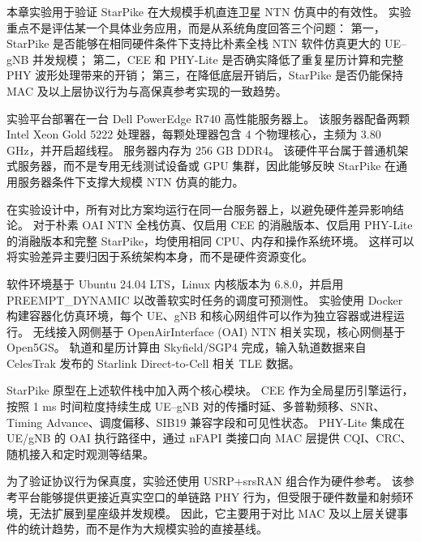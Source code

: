 

\label{prototype}

本章实验用于验证 StarPike 在大规模手机直连卫星 NTN 仿真中的有效性。
实验重点不是评估某一个具体业务应用，而是从系统角度回答三个问题：
第一，StarPike 是否能够在相同硬件条件下支持比朴素全栈 NTN 软件仿真更大的 UE--gNB 并发规模；
第二，CEE 和 PHY-Lite 是否确实降低了重复星历计算和完整 PHY 波形处理带来的开销；
第三，在降低底层开销后，StarPike 是否仍能保持 MAC 及以上层协议行为与高保真参考实现的一致趋势。


实验平台部署在一台 Dell PowerEdge R740 高性能服务器上。
该服务器配备两颗 Intel Xeon Gold 5222 处理器，每颗处理器包含 4 个物理核心，主频为 3.80 GHz，并开启超线程。
服务器内存为 256 GB DDR4。
该硬件平台属于普通机架式服务器，而不是专用无线测试设备或 GPU 集群，因此能够反映 StarPike 在通用服务器条件下支撑大规模 NTN 仿真的能力。

在实验设计中，所有对比方案均运行在同一台服务器上，以避免硬件差异影响结论。
对于朴素 OAI NTN 全栈仿真、仅启用 CEE 的消融版本、仅启用 PHY-Lite 的消融版本和完整 StarPike，均使用相同 CPU、内存和操作系统环境。
这样可以将实验差异主要归因于系统架构本身，而不是硬件资源变化。


软件环境基于 Ubuntu 24.04 LTS，Linux 内核版本为 6.8.0，并启用 PREEMPT\_DYNAMIC 以改善软实时任务的调度可预测性。
实验使用 Docker 构建容器化仿真环境，每个 UE、gNB 和核心网组件可以作为独立容器或进程运行。
无线接入网侧基于 OpenAirInterface (OAI) NTN 相关实现，核心网侧基于 Open5GS。
轨道和星历计算由 Skyfield/SGP4 完成，输入轨道数据来自 CelesTrak 发布的 Starlink Direct-to-Cell 相关 TLE 数据。

StarPike 原型在上述软件栈中加入两个核心模块。
CEE 作为全局星历引擎运行，按照 1 ms 时间粒度持续生成 UE--gNB 对的传播时延、多普勒频移、SNR、Timing Advance、调度偏移、SIB19 兼容字段和可见性状态。
PHY-Lite 集成在 UE/gNB 的 OAI 执行路径中，通过 nFAPI 类接口向 MAC 层提供 CQI、CRC、随机接入和定时观测等结果。

为了验证协议行为保真度，实验还使用 USRP+srsRAN 组合作为硬件参考。
该参考平台能够提供更接近真实空口的单链路 PHY 行为，但受限于硬件数量和射频环境，无法扩展到星座级并发规模。
因此，它主要用于对比 MAC 及以上层关键事件的统计趋势，而不是作为大规模实验的直接基线。


